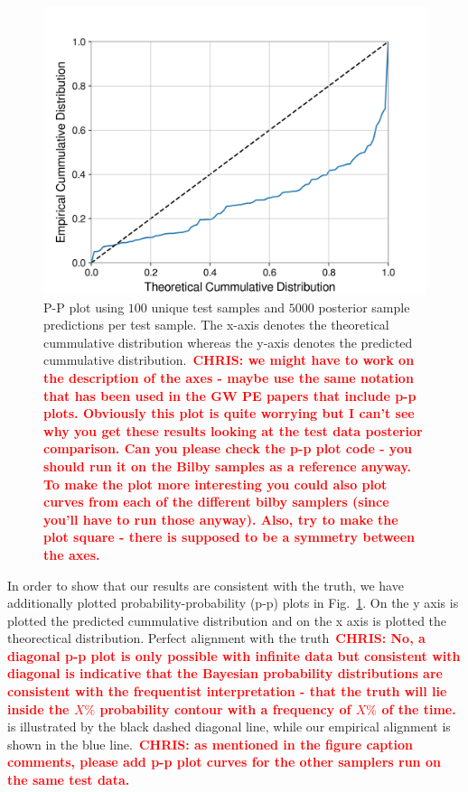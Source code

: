 \documentclass[%
showpacs,
 amsmath,amssymb,
 aps,
 twocolumn,
 prl,
 reprint,
floatfix,
]{revtex4-1}
\newcommand{\chris}[1]{\textbf{\textcolor{red}{CHRIS: #1}}}
\begin{document}
%
%
\begin{figure}
    \includegraphics[width=\columnwidth]{images/latest_pp_plot.png}
    \caption{\label{fig:pp_plot} P-P plot using $100$ unique test samples and
$5000$ posterior sample predictions per test sample.  The x-axis denotes the
theoretical cummulative distribution whereas the y-axis denotes the predicted
cummulative distribution.~\chris{we might have to work on the description of
the axes - maybe use the same notation that has been used in the GW PE papers
that include p-p plots. Obviously this plot is quite worrying but I can't see
why you get these results looking at the test data posterior comparison. Can
you please check the p-p plot code - you should run it on the Bilby samples as
a reference anyway. To make the plot more interesting you could also plot
curves from each of the different bilby samplers (since you'll have to run
those anyway). Also, try to make the plot square - there is supposed to be a
symmetry between the axes.}} 
\end{figure}
%
In order to show that our results are consistent with the truth, we have
additionally plotted probability-probability (p-p) plots in
Fig.~\ref{fig:pp_plot}. On the y axis is plotted the predicted cummulative
distribution and on the x axis is plotted the theorectical distribution.
Perfect alignment with the truth~\chris{No, a diagonal p-p plot is only
possible with infinite data but consistent with diagonal is indicative that the
Bayesian probability distributions are consistent with the frequentist
interpretation - that the truth will lie inside the $X\%$ probability contour
with a frequency of $X\%$ of the time.} is illustrated by the black dashed
diagonal line, while our empirical alignment is shown in the blue
line.~\chris{as mentioned in the figure caption comments, please add p-p plot
curves for the other samplers run on the same test data.} 
\end{document}

